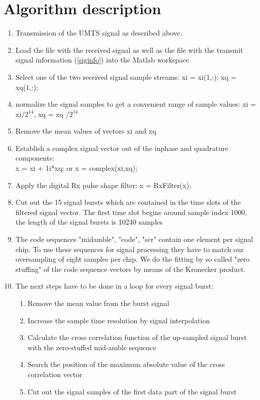 \section{Algorithm description\cite{e1}}
\begin{enumerate}
	\item Transmission of the UMTS signal as described above.
	\item Load the file with the received signal as well as the file with the transmit signal information (\ref{siginfo}) into the Matlab workspace
	\item Select one of the two received signal sample streams: xi = xi(1,:); xq = xq(1,:);
	\item normalize the signal samples to get a convenient range of sample values: xi = xi/$2^{14}$, xq = xq /$2^{14}$
	\item Remove the mean values of vectors xi and xq
	\item Establish a complex signal vector out of the inphase and quadrature components:\\
	x = xi + 1i*xq: or x = complex(xi,xq);
	\item Apply the digital Rx pulse shape filter: x = RxFilter(x);
	\item Cut out the 15 signal bursts which are contained in the time slots of the filtered signal vector. The first time slot begins around sample index 1000, the length of the signal bursts is 10240 samples
	\item The code sequences "midamble", "code", "scr" contain one element per signal chip. To use these sequences for signal processing they have to match our oversampling of eight samples per chip. We do the fitting by so called "zero stuffing" of the code sequence vectors by means of the Kronecker product.
	\item The next steps have to be done in a loop for every signal burst:
	\begin{enumerate}[label = (\alph*)]
		\item Remove the mean value from the burst signal
		\item Increase the sample time resolution by signal interpolation
		\item Calculate the cross correlation function of the up-sampled signal burst with the zero-stuffed mid-amble sequence
		\item Search the position of the maximum absolute value of the cross correlation vector
		\item Cut out the signal samples of the first data part of the signal burst

\end{enumerate}
\end{enumerate}
